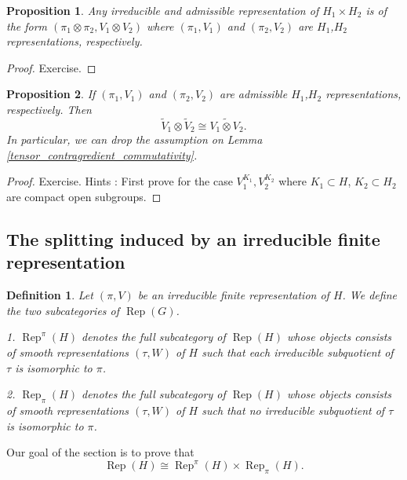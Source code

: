 \documentclass[8pt]{article}
\newtheorem{proposition}{Proposition}[section]
\newtheorem{definition}{Definition}[section]
\DeclareMathOperator{\Rep}{Rep}
\begin{document}
\begin{proposition}
  Any irreducible and admissible representation of $H_1\times H_2$ is of the form $(\pi_1\otimes\pi_2,V_1\otimes V_2)$ where 
  $(\pi_1,V_1)$ and $(\pi_2,V_2)$ are $H_1$,$H_2$ representations, respectively. 
\end{proposition}
\begin{proof}
  Exercise.
\end{proof}

\begin{proposition}
  If $(\pi_1,V_1)$ and $(\pi_2,V_2)$ are admissible $H_1$,$H_2$ representations, respectively. Then 
  \begin{equation*}
    \widetilde{V}_1\otimes\widetilde{V}_2 \cong \widetilde{V_1\otimes V_2}.
  \end{equation*}
  In particular, we can drop the assumption on Lemma \ref{tensor_contragredient_commutativity}.
\end{proposition}

\begin{proof}
  Exercise. Hints : First prove for the case $V_1^{K_1},V_2^{K_2}$ where $K_1\subset H$, $K_2\subset H_2$ are compact open subgroups.
\end{proof}

\subsection{The splitting induced by an irreducible finite representation}

\begin{definition}
  Let $(\pi,V)$ be an irreducible finite representation of $H$. We define the two subcategories of $\Rep(G)$.\\
  \par 1. $\Rep^\pi(H)$ denotes the full subcategory of $\Rep(H)$ whose objects consists of smooth representations $(\tau,W)$ of $H$ such that each irreducible subquotient of $\tau$ is isomorphic to $\pi$.\\
  \par 2. $\Rep_\pi(H)$ denotes the full subcategory of $\Rep(H)$ whose objects consists of smooth representations $(\tau, W)$ of $H$ such that no irreducible subquotient of $\tau$ is isomorphic to $\pi$.
\end{definition}

Our goal of the section is to prove that 
\begin{equation*}
  \Rep(H) \cong\Rep^\pi(H)\times\Rep_\pi(H).
\end{equation*}
\end{document}
